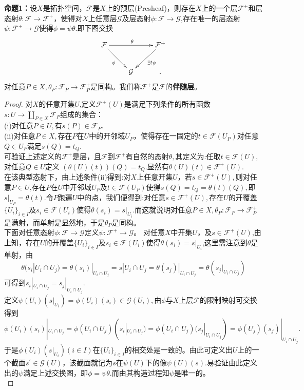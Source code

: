 \documentclass[UTF8]{article}
\begin{document}
	\textbf{命题1：}设$X$是拓扑空间，$\mathcal{F}$是$X$上的预层(Presheaf)，则存在$X$上的一个层$\mathcal{F}^{+}$和层态射$\theta :\mathcal{F}\rightarrow \mathcal{F}^{+}$，使得对$X$上任意层$\mathcal{G}$及层态射$\phi:\mathcal{F}\rightarrow \mathcal{G}$,存在唯一的层态射$\psi:\mathcal{F}^{+}\rightarrow \mathcal{G}$使得$\phi=\psi \theta.$即下图交换
	 $$
	\xymatrix{
	      \mathcal{F}\ar[rr]^{\theta}\ar[dr]_{\phi}& &\mathcal{F}^{+} \ar[dl]^{\exists !\psi}\\
		           & \mathcal{G}&
.}
	$$
	对任意$P\in X,$$\theta_{P}:\mathcal{F}_{P}\rightarrow \mathcal{F}^{+}_{P}$是同构。我们称$\mathcal{F}^{+}$是$\mathcal{F}$的\textbf{伴随层}。\\
	\begin{proof}
		对$X$的任意开集$U$,定义$\mathcal{F}^{+}(U)$是满足下列条件的所有函数
	$s:U\rightarrow \amalg_{P\in X}\mathcal{F}_{P}$组成的集合：\\
	(i)对任意$P\in U,$有$s(P)\in \mathcal{F}_{P}.$\\
	(ii)对任意$P\in X,$存在$P$在$U$中的开邻域$U_{P}$，使得存在一固定的$t\in \mathcal{F}(U_{P})$对任意$Q\in U_{P}$满足$s(Q)=t_{Q}$.\\
	可验证上述定义的$\mathcal{F}^{+}$是层，且$\mathcal{F}$到$\mathcal{F}^{+}$有自然的态射$\theta,$其定义为:任取$t\in \mathcal{F}(U),$对任意$Q\in U$定义
	$(\theta(U)(t))(Q)=t_{Q}.$显然有$\theta(U)(t)\in \mathcal{F}^{+}(U)$.\\
	在该典型态射下，由上述条件(ii)得到:对$X$上任意开集$U$，若$s\in \mathcal{F}^{+}(U),$则对任意$P\in U$,存在$P$在$U$中开邻域$U_{P}$及$t\in \mathcal{F}(U_{P})$使得$s(Q)=t_{Q}=\theta(t)(Q),$即$s|_{U_{P}}=\theta(t)$.令$P$跑遍$U$中的点，我们便得到:对任意$s\in \mathcal{F}^{+}(U),$存在$U$的开覆盖$\{U_{i}\}_{i\in I}$及$s_{i}\in \mathcal{F}(U_{i})$使得$\theta(s_{i})=s|_{U_{i}}$.而这就说明对任意$P\in X,\theta_{P}:\mathcal{F}_{P}\rightarrow \mathcal{F}^{+}_{P}$是满射，而单射是显然地，于是$\theta_{P}$是同构。\\
	下面对任意态射$\phi:\mathcal{F}\rightarrow \mathcal{G}$定义$\psi:\mathcal{F}^{+}\rightarrow \mathcal{G}$。
	对任意$X$中开集$U$，及$s\in \mathcal{F}^{+}(U)$,由上知，存在$U$的开覆盖$\{U_{i}\}_{i\in I}$及$s_{i}\in \mathcal{F}(U_{i})$使得$\theta(s_{i})=s|_{U_{i}}$,这里需注意到$\theta $是单射，由
	$$\theta(s_{i}|U_{i}\cap U_{j})=\theta(s_{i})|_{U_{i}\cap U_{j}}=s|{U_{i}\cap U_{j}}=\theta(s_{j})|_{U_{i}\cap U_{j}}=\theta(s_{j}|_{U_{i}\cap U_{j}})$$
	可得到$s_{i}|_{U_{i}\cap U_{j}}=s_{j}|_{U_{i}\cap U_{j}}.$\\
	   定义$\psi(U_{i})(s|_{U_{i}})=\phi(U_{i})(s_{i})\in \mathcal{G}(U_{i}),$由$\phi$与$X$上层$\mathcal{F}$的限制映射可交换得到
	$$\phi(U_{i})(s_{i})|_{U_{i}\cap U_{j}}=\phi(U_{i}\cap U_{j})(s_{i}|_{U_{i}\cap U_{j}})
	= \phi(U_{i}\cap U_{j})(s_{j}|_{U_{i}\cap U_{j}})  =\phi(U_{j})(s_{j})|_{U_{i}\cap U_{j}}.$$
	于是$\phi(U_{i})(s|_{U_{i}})(i\in I)$在$\{U_{i}\}_{i\in I}$的相交处是一致的。由此可定义出$U$上的一个截面$s^{'}\in \mathcal{G}(U)$，该截面就记为$s$在$\psi(U)$下的像$\psi(U)(s).$易验证由此定义出的$\psi$满足上述交换图，即$\phi=\psi\theta.$而由其构造过程知$\psi$是唯一的。\\
\end{proof}
\end{document}
